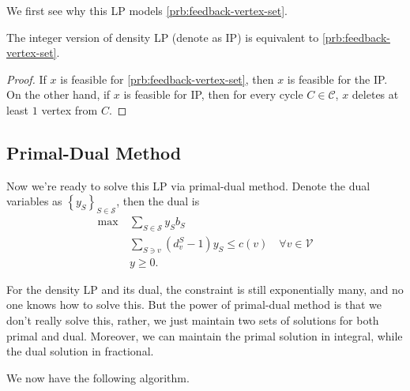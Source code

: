 We first see why this LP models \autoref{prb:feedback-vertex-set}.

\begin{lemma}\label{lma:feedback-vertex-set-1}
	The integer version of density LP (denote as IP) is equivalent to \autoref{prb:feedback-vertex-set}.
\end{lemma}
\begin{proof}
	If \(x\) is feasible for \autoref{prb:feedback-vertex-set}, then \(x\) is feasible for the IP. On the other hand, if \(x\) is feasible for IP, then for every cycle \(C\in \mathcal{C} \), \(x\) deletes at least \(1\) vertex from \(C\).
\end{proof}

\subsection{Primal-Dual Method}
Now we're ready to solve this LP via primal-dual method. Denote the dual variables as \(\left\{ y_S \right\} _{S\in \mathcal{S} }\), then the dual is
\[
	\begin{aligned}
		\max~ & \sum_{S\in \mathcal{S} } y_S b_S                                       \\
		      & \sum_{S\ni v}(d_{v} ^S - 1)y_S \leq c(v)\quad \forall v\in \mathcal{V} \\
		      & y\geq 0.
	\end{aligned}
\]

\begin{note}
	For the density LP and its dual, the constraint is still exponentially many, and no one knows how to solve this. But the power of primal-dual method is that we don't really solve this, rather, we just maintain two sets of solutions for both primal and dual. Moreover, we can maintain the primal solution in integral, while the dual solution in fractional.
\end{note}

We now have the following algorithm.

